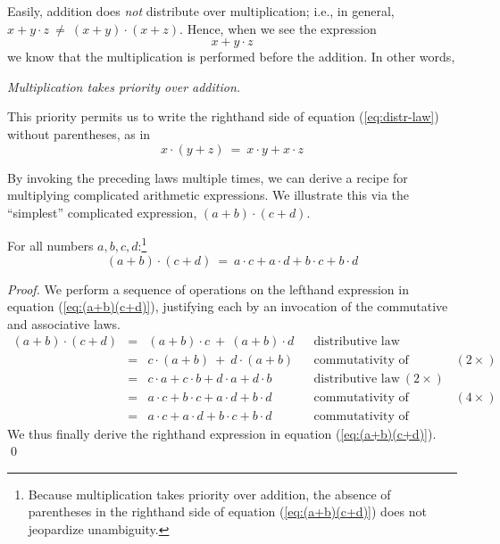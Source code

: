 Easily, addition does {\em not} distribute over multiplication; i.e.,
in general, $x + y \cdot z \ \neq \ (x+y) \cdot (x+z)$.  Hence, when
we see the expression
\[ x + y \cdot z \]
we know that the multiplication is performed before the addition.  In
other words,

 {\em Multiplication takes priority over addition.}

\noindent This priority permits us to write the righthand side of
equation (\ref{eq:distr-law}) without parentheses, as in
\[ x \cdot (y + z) \ = \ x \cdot y + x \cdot z \]

\medskip

By invoking the preceding laws multiple times, we can derive a recipe
for multiplying complicated arithmetic expressions.  We illustrate
this via the ``simplest'' complicated expression, $(a+b) \cdot (c+d)$.

\begin{prop}
\label{prop:(a+b)(c+d)}
For all numbers $a, b, c, d$:\footnote{Because multiplication takes
  priority over addition, the absence of parentheses in the righthand
  side of equation (\ref{eq:(a+b)(c+d)}) does not jeopardize
  unambiguity.}
\begin{equation}
\label{eq:(a+b)(c+d)}
(a+b) \cdot (c+d) \ = \ a \cdot c + a \cdot d + b \cdot c + b \cdot d
\end{equation}
\end{prop}

\begin{proof}
We perform a sequence of operations on the lefthand expression in
equation (\ref{eq:(a+b)(c+d)}), justifying each by an invocation of
the commutative and associative laws.
\[
\begin{array}{lclll}
(a+b) \cdot (c+d) & = & (a+b) \cdot c \ + \ (a+b) \cdot d
& & \mbox{distributive law} \\ 
  & = & c \cdot (a+b) \ + \ d \cdot (a+b)
& & \mbox{commutativity of multiplication} \ (2 \times) \\
  & = & c \cdot a + c \cdot b + d \cdot a + d \cdot b 
& & \mbox{distributive law} \ (2 \times) \\
  & = & a \cdot c + b \cdot c + a \cdot d + b \cdot d
& & \mbox{commutativity of multiplication} \ (4 \times) \\
  & = &  a \cdot c + a \cdot d + b \cdot c + b \cdot d
& & \mbox{commutativity of addition}
\end{array}
\]
We thus finally derive the righthand expression in equation
(\ref{eq:(a+b)(c+d)}).  \qed
\end{proof}


